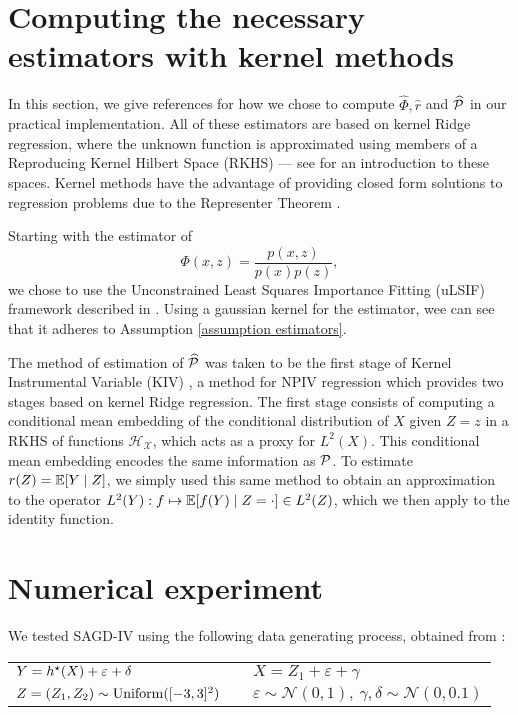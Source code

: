 \section{Computing the necessary estimators with kernel methods}
\label{sec: kernel methods}

In this section, we give references for how we chose to compute $ \hat{ \Phi }, \hat{ r } $ and $ \widehat{ \mathcal{P} } $ in our practical implementation.
All of these estimators are based on kernel Ridge regression, where the unknown function is approximated using members of a Reproducing Kernel Hilbert Space (RKHS) --- see \cite[Chapter~4]{svm2008} for an introduction to these spaces. 
Kernel methods have the advantage of providing closed form solutions to regression problems due to the Representer Theorem \cite[Theorem~1]{representer2001}.

Starting with the estimator of
\begin{equation*}
    \Phi ( x, z ) = \frac{ p ( x, z ) }{ p ( x ) p ( z ) }
,\end{equation*}
we chose to use the Unconstrained Least Squares Importance Fitting (uLSIF) framework described in \cite[Chapter~6]{sugiyama2012}.
Using a gaussian kernel for the estimator, wee can see that it adheres to Assumption \ref{assumption estimators}.

The method of estimation of $ \widehat{ \mathcal{P} } $ was taken to be the first stage of Kernel Instrumental Variable (KIV) \cite{singh2019}, a method for NPIV regression which provides two stages based on kernel Ridge regression.
The first stage consists of computing a conditional mean embedding \cite{cme2009} of the conditional distribution of $ X $ given $ Z = z $ in a RKHS of functions $ \mathcal{H}_{ \mathcal{X} } $, which acts as a proxy for $ L^2 ( X ) $.
This conditional mean embedding encodes the same information as $ \mathcal{P} $.
To estimate $ r ( Z ) = \mathbb{E} [ Y \mid Z ] $, we simply used this same method to obtain an approximation to the operator $ L^2 ( Y ) : f \mapsto \mathbb{E} [ f ( Y ) \mid Z = \cdot ] \in L^2 ( Z ) $, which we then apply to the identity function.

\section{Numerical experiment}

We tested SAGD-IV using the following data generating process, obtained from \cite{deepgmm2019}:

\begin{tabular}{lcl}
    $ Y = h^{ \star } ( X ) + \varepsilon + \delta $ & &
    $ X = Z_{ 1 } + \varepsilon + \gamma $ \\
    $ Z = ( Z_{ 1 }, Z_{ 2 } ) \sim \operatorname{Uniform} ( [-3, 3]^2 ) $ & &
    $ \varepsilon \sim \mathcal{N} ( 0, 1 ), \ \gamma, \delta \sim \mathcal{N} ( 0, 0.1 ) $
\end{tabular}

